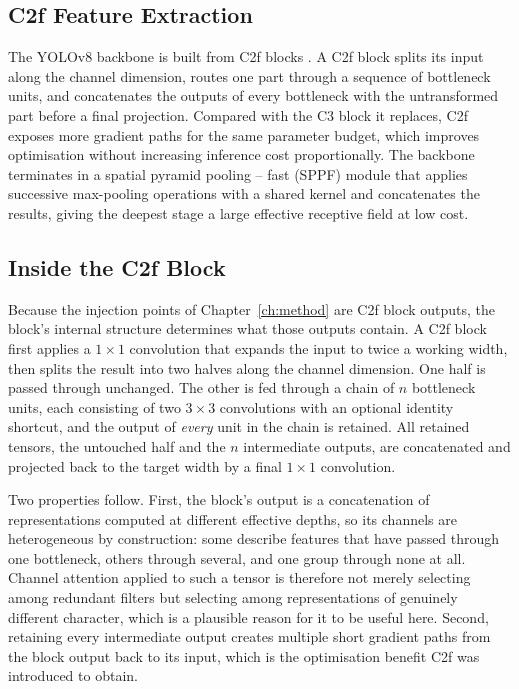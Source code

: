 \documentclass[MScCS]{uccthesis}
\begin{document}
\subsection{C2f Feature Extraction}

The YOLOv8 backbone is built from C2f blocks \parencite{ultralytics2023yolov8}.
A C2f block splits its input along the channel dimension, routes one part
through a sequence of bottleneck units, and concatenates the outputs of every
bottleneck with the untransformed part before a final projection. Compared with
the C3 block it replaces, C2f exposes more gradient paths for the same
parameter budget, which improves optimisation without increasing inference
cost proportionally. The backbone terminates in a spatial pyramid pooling --
fast (SPPF) module that applies successive max-pooling operations with a shared
kernel and concatenates the results, giving the deepest stage a large effective
receptive field at low cost.

\subsection{Inside the C2f Block}

Because the injection points of Chapter~\ref{ch:method} are C2f block outputs,
the block's internal structure determines what those outputs contain. A C2f
block first applies a $1 \times 1$ convolution that expands the input to twice
a working width, then splits the result into two halves along the channel
dimension. One half is passed through unchanged. The other is fed through a
chain of $n$ bottleneck units, each consisting of two $3 \times 3$
convolutions with an optional identity shortcut, and the output of \emph{every}
unit in the chain is retained. All retained tensors, the untouched half and
the $n$ intermediate outputs, are concatenated and projected back to the
target width by a final $1 \times 1$ convolution.

Two properties follow. First, the block's output is a concatenation of
representations computed at different effective depths, so its channels are
heterogeneous by construction: some describe features that have passed through
one bottleneck, others through several, and one group through none at all.
Channel attention applied to such a tensor is therefore not merely selecting
among redundant filters but selecting among representations of genuinely
different character, which is a plausible reason for it to be useful here.
Second, retaining every intermediate output creates multiple short gradient
paths from the block output back to its input, which is the optimisation
benefit C2f was introduced to obtain.
\end{document}
